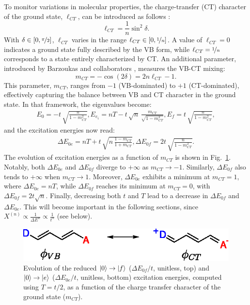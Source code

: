 \documentclass[journal=jpcafh]{achemso}
\begin{document}
To monitor variations in molecular properties, the charge-transfer (CT) character of the ground state, $\ell_{CT}$, can be introduced as follows \cite{choNonlinearOpticalProperties2002,choElementaryDescriptionNonlinear1998,yangLargeOffDiagonalContribution2003}:
\begin{equation}
	\ell_{CT} = \frac{1}{n} \sin^2 \delta.
\end{equation}
With $\delta \in [0, \nicefrac{\pi}{2}]$, $\ell_{CT}$ varies in the range $\ell_{CT} \in [0, \nicefrac{1}{n}]$. A value of $\ell_{CT} = 0$ indicates a ground state fully described by the VB form, while $\ell_{CT} = \nicefrac{1}{n}$ corresponds to a state entirely characterized by CT. 
An additional parameter, introduced by Barzoukas and collaborators \cite{barzoukasTWOFORMDESCRIPTIONPUSHPULL1996,barzoukasTwostateDescriptionHyper1996,blanchard-desceTwoformTwostateAnalysis1998a}, measures the VB-CT mixing:
\begin{equation}
	m_{CT} = -\cos(2\delta) = 2n \ell_{CT} - 1.
\end{equation} 
This parameter, $m_{CT}$, ranges from $-1$ (VB-dominated) to $+1$ (CT-dominated), effectively capturing the balance between VB and CT character in the ground state. In that framework, the eigenvalues become:\begin{align}
E_{0} = -t\,\sqrt{\frac{n}{1-m_{CT}^2}},
E_{e_i} = nT -t\,\sqrt{n}\,\frac{m_{CT}}{\sqrt{1-m_{CT}^2}},
E_{f} = t\,\sqrt{\frac{n}{1-m_{CT}^2}},
\end{align} 
and the excitation energies now read:\begin{align}
	\Delta E_{0e}= nT + t\,\sqrt{n\,\frac{1-m_{CT}}{1+m_{CT}}}, \Delta E_{0f} = 2t\,\sqrt{\frac{n}{1-m_{CT}^2}}. \label{eq:energiesmct}
\end{align}
The evolution of excitation energies as a function of $m_{CT}$ is shown in Fig.~\ref{fig:eexci}. Notably, both $\Delta E_{0e}$ and $\Delta E_{0f}$ diverge to $+\infty$ as $m_{CT} \to -1$. Similarly, $\Delta E_{0f}$ also tends to $+\infty$ when $m_{CT} \to 1$.  
Moreover, $\Delta E_{0e}$ exhibits a minimum at $m_{CT} = 1$, where $\Delta E_{0e} = nT$, while $\Delta E_{0f}$ reaches its minimum at $m_{CT} = 0$, with $\Delta E_{0f} = 2t\sqrt{n}$. Finally, decreasing both $t$ and $T$ lead to a decrease in $\Delta E_{0f}$ and $\Delta E_{0e}$. This will become important in the following sections, since $X^{(n)} \propto \frac{1}{\Delta E^n} \propto \frac{1}{t^n}$ (see below).


\begin{figure}[!h]
	\includegraphics[width=.7\linewidth]{Figure1}
	\caption{Evolution of the reduced $\ket{0}\to\ket{f}$ ($\Delta E_{0f} / t$, unitless, top) and $\ket{0}\to\ket{e}$ ($\Delta E_{0e} /t$, unitless, bottom) excitation energies, computed using $T = t/2$, as a function of the charge transfer character of the ground state ($m_{CT}$).}
	\label{fig:eexci}
\end{figure}
\end{document}
